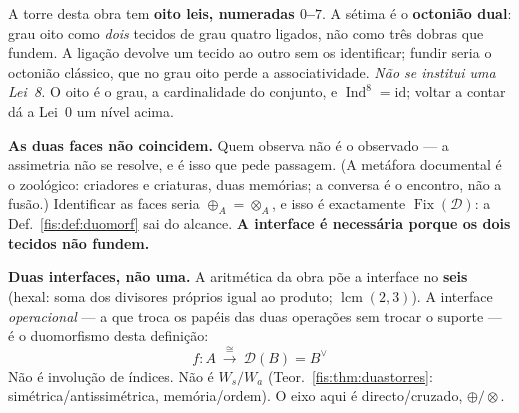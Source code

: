 \documentclass[livro.tex]{subfiles}
\begin{document}
\begin{observacao}\label{fis:obs:octoniao-interface}
A torre desta obra tem \textbf{oito leis, numeradas $0$--$7$}. A sétima é o
\textbf{octonião dual}: grau oito como \emph{dois} tecidos de grau quatro
ligados, não como três dobras que fundem. A ligação devolve um tecido ao outro
sem os identificar; fundir seria o octonião clássico, que no grau oito perde a
associatividade. \emph{Não se institui uma Lei~8.} O oito é o grau, a
cardinalidade do conjunto, e $\operatorname{Ind}^{8}=\mathrm{id}$; voltar a
contar dá a Lei~0 um nível acima.

\medskip\noindent\textbf{As duas faces não coincidem.} Quem observa não é o
observado --- a assimetria não se resolve, e é isso que pede passagem. (A
metáfora documental é o zoológico: criadores e criaturas, duas memórias; a
conversa é o encontro, não a fusão.) Identificar as faces seria
$\oplus_A=\otimes_A$, e isso é exactamente $\operatorname{Fix}(\mathcal{D})$:
a Def.~\ref{fis:def:duomorf} sai do alcance. \textbf{A interface é necessária
porque os dois tecidos não fundem.}

\medskip\noindent\textbf{Duas interfaces, não uma.} A aritmética da obra põe a
interface no \textbf{seis} (hexal: soma dos divisores próprios igual ao produto;
$\operatorname{lcm}(2,3)$). A interface \emph{operacional} --- a que troca os
papéis das duas operações sem trocar o suporte --- é o duomorfismo desta
definição:
\[
\boxed{\;
f\colon A\ \xrightarrow{\ \cong\ }\ \mathcal{D}(B)=B^{\vee}
\;}
\]
Não é involução de índices. Não é $W_s/W_a$ (Teor.~\ref{fis:thm:duastorres}:
simétrica/antissimétrica, memória/ordem). O eixo aqui é
directo/cruzado, $\oplus/\otimes$.


\end{observacao}
\end{document}
